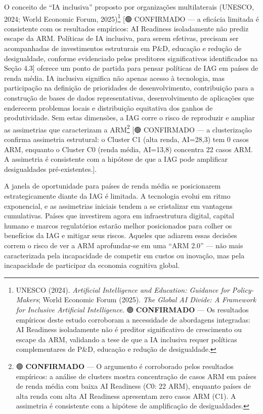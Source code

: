 \documentclass[
  brazilian,
  12pt,
]{article}
\begin{document}
O conceito de ``IA inclusiva'' proposto por organizações multilaterais (UNESCO, 2024; World Economic Forum, 2025)\footnote{UNESCO (2024). \emph{Artificial Intelligence and Education: Guidance for Policy-Makers}; World Economic Forum (2025). \emph{The Global AI Divide: A Framework for Inclusive Artificial Intelligence}. 🟢 \textbf{CONFIRMADO} --- Os resultados empíricos deste estudo corroboram a necessidade de abordagens integradas: AI Readiness isoladamente não é preditor significativo de crescimento ou escape da ARM, validando a tese de que a IA inclusiva requer políticas complementares de P\&D, educação e redução de desigualdade.} {[}🟢 CONFIRMADO --- a eficácia limitada é consistente com os resultados empíricos: AI Readiness isoladamente não prediz escape da ARM. Políticas de IA inclusiva, para serem efetivas, precisam ser acompanhadas de investimentos estruturais em P\&D, educação e redução de desigualdade, conforme evidenciado pelos preditores significativos identificados na Seção 4.3{]} oferece um ponto de partida para pensar políticas de IAG em países de renda média. IA inclusiva significa não apenas acesso à tecnologia, mas participação na definição de prioridades de desenvolvimento, contribuição para a construção de bases de dados representativas, desenvolvimento de aplicações que enderecem problemas locais e distribuição equitativa dos ganhos de produtividade. Sem estas dimensões, a IAG corre o risco de reproduzir e ampliar as assimetrias que caracterizam a ARM\footnote{🟢 \textbf{CONFIRMADO} --- O argumento é corroborado pelos resultados empíricos: a análise de clusters mostra concentração de casos ARM em países de renda média com baixa AI Readiness (C0: 22 ARM), enquanto países de alta renda com alta AI Readiness apresentam zero casos ARM (C1). A assimetria é consistente com a hipótese de amplificação de desigualdades.} {[}🟢 CONFIRMADO --- a clusterização confirma assimetria estrutural: o Cluster C1 (alta renda, AI=28,3) tem 0 casos ARM, enquanto o Cluster C0 (renda média, AI=13,8) concentra 22 casos ARM. A assimetria é consistente com a hipótese de que a IAG pode amplificar desigualdades pré-existentes.{]}.

A janela de oportunidade para países de renda média se posicionarem estrategicamente diante da IAG é limitada. A tecnologia evolui em ritmo exponencial, e as assimetrias iniciais tendem a se cristalizar em vantagens cumulativas. Países que investirem agora em infraestrutura digital, capital humano e marcos regulatórios estarão melhor posicionados para colher os benefícios da IAG e mitigar seus riscos. Aqueles que adiarem essas decisões correm o risco de ver a ARM aprofundar-se em uma ``ARM 2.0'' --- não mais caracterizada pela incapacidade de competir em custos ou inovação, mas pela incapacidade de participar da economia cognitiva global.
\end{document}
